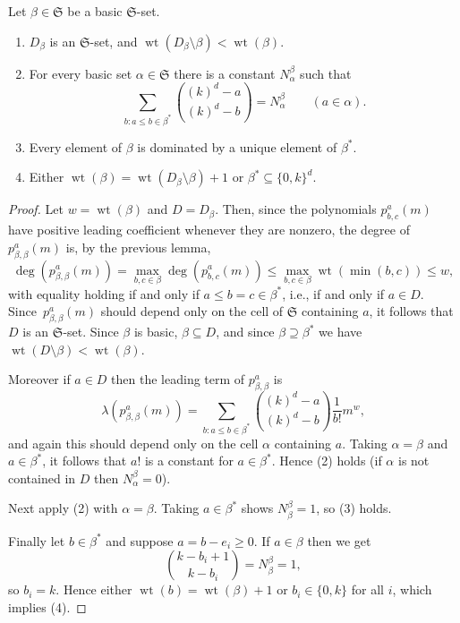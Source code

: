 \documentclass[ALCO]{cedram}
\newcommand{\fS}{\mathfrak S}
\newcommand{\wt}{\operatorname{wt}}
\renewcommand{\subset}{\subseteq}
\renewcommand{\supset}{\supseteq}
\begin{document}
\begin{prop}\label{key-prop}
    Let $\beta \in \fS$ be a basic $\fS$-set.
    \begin{enumerate}
        \item $D_\beta$ is an $\fS$-set, and $\wt(D_\beta \setminus \beta) < \wt(\beta)$.
        \item For every basic set $\alpha \in \fS$ there is a constant $N^\beta_\alpha$ such that
        \[
            \sum_{b : a \leq b \in \beta^*} \binom{(k)^d - a}{(k)^d - b} = N^\beta_\alpha \qquad (a \in \alpha).
        \]
        \item Every element of $\beta$ is dominated by a unique element of $\beta^*$.
        \item Either $\wt(\beta) = \wt(D_\beta \setminus \beta) + 1$ or $\beta^* \subset \{0, k\}^d$.
    \end{enumerate}
\end{prop}
\begin{proof}
    Let $w = \wt(\beta)$ and $D = D_\beta$.
    Then, since the polynomials $p^a_{b,c}(m)$ have positive leading coefficient whenever they are nonzero,
    the degree of $p^a_{\beta,\beta}(m)$ is, by the previous lemma,
    \[
        \deg(p^a_{\beta,\beta}(m)) = \max_{b, c \in \beta} \deg(p^a_{b,c}(m)) \le \max_{b, c \in \beta} \wt(\min(b, c)) \le w,
    \]
    with equality holding if and only if $a \leq b = c \in \beta^*$, i.e., if and only if $a \in D$.
    Since~$p^a_{\beta,\beta}(m)$ should depend only on the cell of $\fS$ containing $a$,
    it follows that $D$ is an $\fS$-set.
    Since $\beta$ is basic, $\beta \subset D$, and since $\beta \supset \beta^*$ we have $\wt(D \setminus \beta) < \wt(\beta)$.
    
    Moreover if $a \in D$ then the leading term of $p^a_{\beta,\beta}$ is
    \[
        \lambda(p^a_{\beta,\beta}(m)) = \sum_{b : a \leq b \in \beta^*} \binom{(k)^d - a}{(k)^d - b} \frac1{b!} m^w,
    \]
    and again this should depend only on the cell $\alpha$ containing $a$.
    {Taking $\alpha = \beta$ and $a\in \beta^*$, it follows that $a!$ is a constant for $a \in \beta^*$.}
    Hence (2) holds (if $\alpha$ is not contained in $D$ then $N^\beta_\alpha = 0$).
    
    Next apply (2) with $\alpha = \beta$.
    Taking $a \in \beta^*$ shows $N^\beta_\beta = 1$, so (3) holds.
    
    Finally let $b \in \beta^*$ and suppose $a = b - e_i \ge 0$.
    If $a \in \beta$ then we get
    \[
        \binom{k-b_i+1}{k-b_i} = N^\beta_\beta = 1,
    \]
    so $b_i = k$.
    Hence either $\wt(b) = \wt(\beta)+1$ or $b_i \in \{0, k\}$ for all $i$, which implies (4).
\end{proof}
\end{document}
